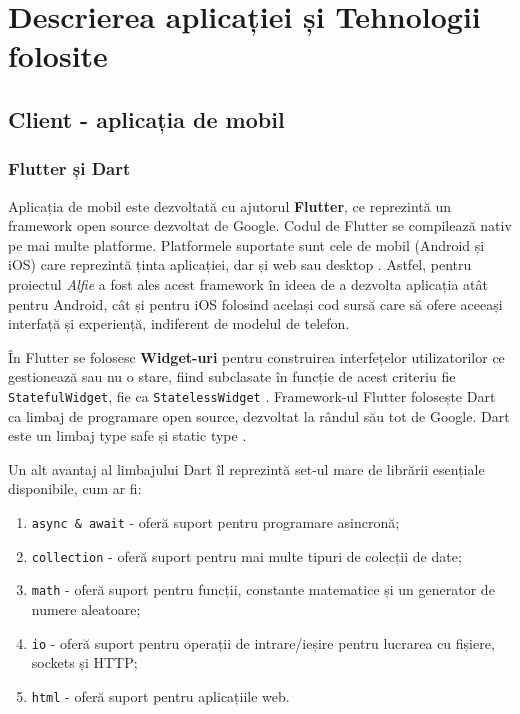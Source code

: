 \chapter{Descrierea aplicației și Tehnologii folosite}

\section{Client - aplicația de mobil}

\subsection{Flutter și Dart}

Aplicația de mobil este dezvoltată cu ajutorul \textbf{Flutter}, ce reprezintă un framework open source dezvoltat de Google. Codul de Flutter se compilează nativ pe mai multe platforme. Platformele suportate sunt cele de mobil (Android și iOS) care reprezintă ținta aplicației, dar și web sau desktop \cite{flutter}. Astfel, pentru proiectul \textit{Alfie} a fost ales acest framework în ideea de a dezvolta aplicația atât pentru Android, cât și pentru iOS folosind același cod sursă care să ofere aceeași interfață și experiență, indiferent de modelul de telefon.

În Flutter se folosesc \textbf{Widget-uri} pentru construirea interfețelor utilizatorilor ce gestionează sau nu o stare, fiind subclasate în funcție de acest criteriu fie \texttt{StatefulWidget}, fie ca \texttt{StatelessWidget} \cite{flutterWidgets}. Framework-ul Flutter folosește Dart ca limbaj de programare open source, dezvoltat la rândul său tot de Google. Dart este un limbaj type safe și static type \cite{dartOverview}.

Un alt avantaj al limbajului Dart îl reprezintă set-ul mare de librării esențiale disponibile, cum ar fi: \cite{dartCoreLibs}
\begin{enumerate}
    \item \texttt{async & await} - oferă suport pentru programare asincronă;
    \item \texttt{collection} - oferă suport pentru mai multe tipuri de colecții de date;
    \item \texttt{math} - oferă suport pentru funcții, constante matematice și un generator de numere aleatoare;
    \item \texttt{io} - oferă suport pentru operații de intrare/ieșire pentru lucrarea cu fișiere, sockets și HTTP;
    \item \texttt{html} - oferă suport pentru aplicațiile web.
\end{enumerate}

